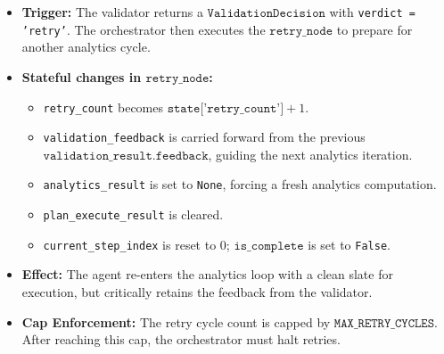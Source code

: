 \begin{itemize}[label=\textbullet]
  \item \textbf{Trigger:} The validator returns a $\texttt{ValidationDecision}$ with \texttt{verdict =
    'retry'}. The orchestrator then executes the $\texttt{retry\_node}$ to prepare for another analytics
    cycle.
  \item \textbf{Stateful changes in $\texttt{retry\_node}$:}
    \begin{itemize}[label=$\rightarrow$]
      \item \texttt{retry\_count} becomes $\texttt{state['retry\_count']} + 1$.
      \item \texttt{validation\_feedback} is carried forward from the previous
        $\texttt{validation\_result.feedback}$, guiding the next analytics iteration.
      \item \texttt{analytics\_result} is set to \texttt{None}, forcing a fresh analytics computation.
      \item \texttt{plan\_execute\_result} is cleared.
      \item \texttt{current\_step\_index} is reset to 0; $\texttt{is\_complete}$ is set to
        \texttt{False}.
    \end{itemize}
  \item \textbf{Effect:} The agent re-enters the analytics loop with a clean slate for execution, but critically retains the feedback from the validator.
  \item \textbf{Cap Enforcement:} The retry cycle count is capped by $\texttt{MAX\_RETRY\_CYCLES}$. After reaching this cap, the orchestrator must halt retries.
\end{itemize}


